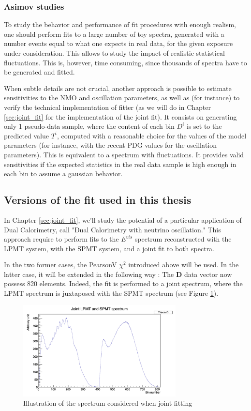 \documentclass[../main.tex]{subfiles}
\begin{document}
\subsubsection{Asimov studies}
\label{sec:juno:Fit:asimov}

To study the behavior and performance of fit procedures with enough realism, one should perform fits to a large number of toy spectra, generated with a number events equal to what one expects in real data, for the given exposure under consideration. This allows to study the impact of realistic statistical fluctuations. This is, however, time consuming, since thousands of spectra have to be generated and fitted.

When subtle details are not crucial, another approach is possible to estimate sensitivities to the NMO and oscillation parameters, as well as (for instance) to verify the technical implementation of fitter (as we will do in Chapter \ref{sec:joint_fit} for the implementation of the joint fit). It consists on generating only 1 pseudo-data sample, where the content of each bin $D^i$ is set to the predicted value $T^i$, computed with a reasonable choice for the values of the model parameters (for instance, with the recent PDG values for the oscillation parameters). This is equivalent to a spectrum with fluctuations. It provides valid sensitivities if the expected statistics in the real data sample is high enough in each bin to assume a gaussian behavior.

\subsection{Versions of the fit used in this thesis}

In Chapter \ref{sec:joint_fit}, we'll study the potential of a particular application of Dual Calorimetry, call "Dual Calorimetry with neutrino oscillation." This approach require to perform fits to the $E^{vis}$ spectrum reconstructed with the LPMT system, with the SPMT system, and a joint fit to both spectra.

In the two former cases, the PearsonV $\chi^2$ introduced above will be used. In the latter case, it will be extended in the following way : The $\bm{D}$ data vector now possess 820 elements. Indeed, the fit is performed to a joint spectrum, where the LPMT spectrum is juxtaposed with the SPMT spectrum (see Figure \ref{fig:juno:joint_fit_spec}).

\begin{figure}[ht]
  \centering
  \includegraphics[height=5cm]{images/juno/joint_fit.png}
  \caption{Illustration of the spectrum considered when joint fitting}
  \label{fig:juno:joint_fit_spec}
\end{figure}
\end{document}
